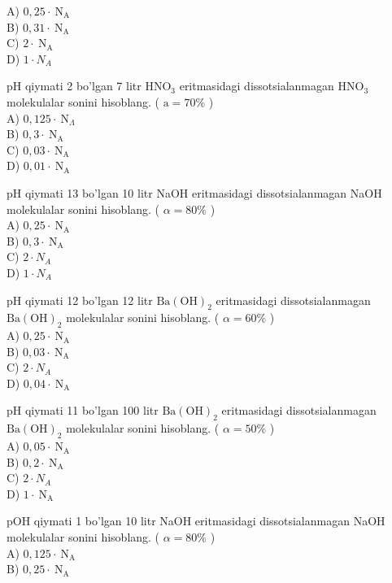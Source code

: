 A) $0,25 \cdot \mathrm{~N}_{\mathrm{A}}$\\
B) $0,31 \cdot \mathrm{~N}_{\mathrm{A}}$\\
C) $2 \cdot \mathrm{~N}_{\mathrm{A}}$\\
D) $1 \cdot N_{A}$
  \item pH qiymati 2 bo'lgan 7 litr $\mathrm{HNO}_{3}$ eritmasidagi dissotsialanmagan $\mathrm{HNO}_{3}$ molekulalar sonini hisoblang. ( $\mathrm{a}=70 \%$ )\\
A) $0,125 \cdot \mathrm{~N}_{\Lambda}$\\
B) $0,3 \cdot \mathrm{~N}_{\mathrm{A}}$\\
C) $0,03 \cdot \mathrm{~N}_{\mathrm{A}}$\\
D) $0,01 \cdot \mathrm{~N}_{\mathrm{A}}$
  \item pH qiymati 13 bo'lgan 10 litr NaOH eritmasidagi dissotsialanmagan NaOH molekulalar sonini hisoblang. ( $\alpha=80 \%$ )\\
A) $0,25 \cdot \mathrm{~N}_{\mathrm{A}}$\\
B) $0,3 \cdot \mathrm{~N}_{\mathrm{A}}$\\
C) $2 \cdot N_{A}$\\
D) $1 \cdot N_{A}$
  \item pH qiymati 12 bo'lgan 12 litr $\mathrm{Ba}(\mathrm{OH})_{2}$ eritmasidagi dissotsialanmagan $\mathrm{Ba}(\mathrm{OH})_{2}$ molekulalar sonini hisoblang. ( $\alpha=60 \%$ )\\
A) $0,25 \cdot \mathrm{~N}_{\mathrm{A}}$\\
B) $0,03 \cdot \mathrm{~N}_{\mathrm{A}}$\\
C) $2 \cdot N_{A}$\\
D) $0,04 \cdot \mathrm{~N}_{\mathrm{A}}$
  \item pH qiymati 11 bo'lgan 100 litr $\mathrm{Ba}(\mathrm{OH})_{2}$ eritmasidagi dissotsialanmagan $\mathrm{Ba}(\mathrm{OH})_{2}$ molekulalar sonini hisoblang. ( $\alpha=50 \%$ )\\
A) $0,05 \cdot \mathrm{~N}_{\mathrm{A}}$\\
B) $0,2 \cdot \mathrm{~N}_{\mathrm{A}}$\\
C) $2 \cdot N_{A}$\\
D) $1 \cdot \mathrm{~N}_{\mathrm{A}}$
  \item pOH qiymati 1 bo'lgan 10 litr NaOH eritmasidagi dissotsialanmagan NaOH molekulalar sonini hisoblang. ( $\alpha=80 \%$ )\\
A) $0,125 \cdot \mathrm{~N}_{\mathrm{A}}$\\
B) $0,25 \cdot \mathrm{~N}_{\mathrm{A}}$\\
